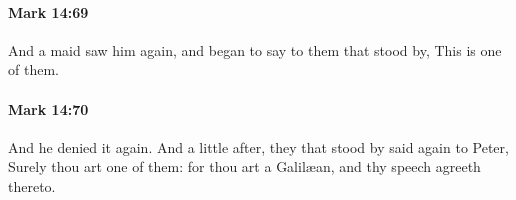 		\paragraph{Mark 14:69} %
			\label{MARK-14-69}

			And a maid saw him again, and began to say to them that stood by, This is one of them.

			\begin{framed}
			\scriptsize
				\begin{compactdesc}
					\item[SBLG] 
				\end{compactdesc}
			\end{framed}

		\paragraph{Mark 14:70} %
			\label{MARK-14-70}

			And he denied it again. And a little after, they that stood by said again to Peter, Surely thou art one of them: for thou art a Galilæan, and thy speech agreeth thereto.

